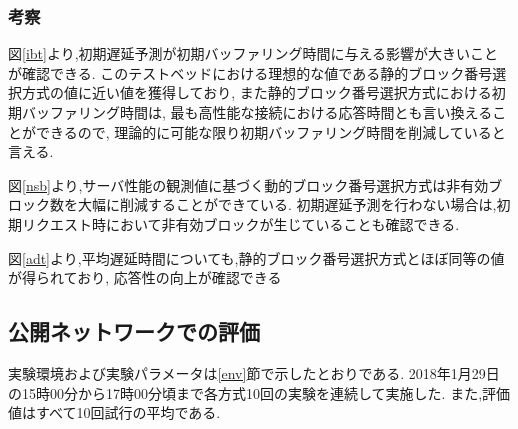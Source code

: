 \documentclass[a4j,12pt]{gradthesis_utf8}
\begin{document}
\clearpage

\subsubsection{考察}
図\ref{ibt}より,初期遅延予測が初期バッファリング時間に与える影響が大きいことが確認できる.
このテストベッドにおける理想的な値である静的ブロック番号選択方式の値に近い値を獲得しており,
また静的ブロック番号選択方式における初期バッファリング時間は,
最も高性能な接続における応答時間とも言い換えることができるので,
理論的に可能な限り初期バッファリング時間を削減していると言える.

図\ref{nsb}より,サーバ性能の観測値に基づく動的ブロック番号選択方式は非有効ブロック数を大幅に削減することができている.
初期遅延予測を行わない場合は,初期リクエスト時において非有効ブロックが生じていることも確認できる.

図\ref{adt}より,平均遅延時間についても,静的ブロック番号選択方式とほぼ同等の値が得られており,
応答性の向上が確認できる

\clearpage

\subsection{公開ネットワークでの評価}
実験環境および実験パラメータは\ref{env}節で示したとおりである.
2018年1月29日の15時00分から17時00分頃まで各方式10回の実験を連続して実施した.
また,評価値はすべて10回試行の平均である.
\end{document}

